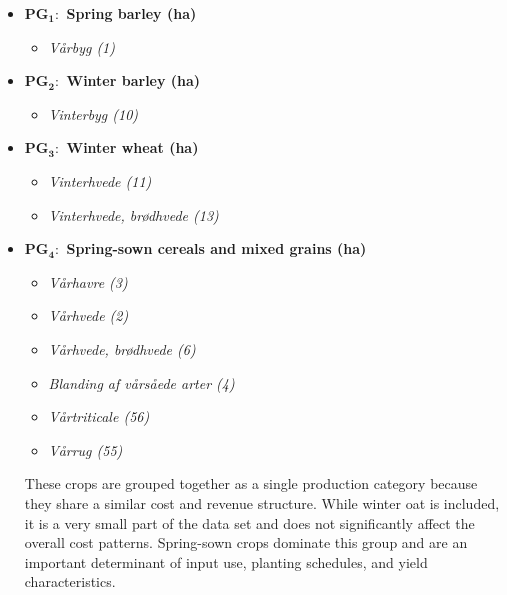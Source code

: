 \documentclass[12pt]{article}
\begin{document}
\begin{itemize}
    \item[] \textbf{PG$_\textbf{1}:$ Spring barley (ha)} 
    \begin{itemize}
        \item[$+$] \textit{Vårbyg (1)}
    \end{itemize}
    \item[] \textbf{PG$_\textbf{2}:$ Winter barley (ha)}
    \begin{itemize}
        \item[$+$] \textit{Vinterbyg (10)}
    \end{itemize}
    \item[] \textbf{PG$_\textbf{3}:$ Winter wheat (ha)}
    \begin{itemize}
        \item[$+$] \textit{Vinterhvede (11)}
        \item[$+$] \textit{Vinterhvede, brødhvede (13)}
    \end{itemize}
    \item[] \textbf{PG$_\textbf{4}:$ Spring-sown cereals and mixed grains (ha)}
    \begin{itemize}
        \item[$+$] \textit{Vårhavre (3)}
        \item[$+$] \textit{Vårhvede (2)}
        \item[$+$] \textit{Vårhvede, brødhvede (6)}
        \item[$+$] \textit{Blanding af vårsåede arter (4)}
        \item[$+$] \textit{Vårtriticale (56)}
        \item[$+$] \textit{Vårrug (55)}
    \end{itemize}
    These crops are grouped together as a single production category because they share a similar cost and revenue structure. 
    While winter oat is included, it is a very small part of the data set and does not significantly affect the overall cost patterns.
    Spring-sown crops dominate this group and are an important determinant of input use, planting schedules, and yield characteristics.
    

\end{itemize}
\end{document}
